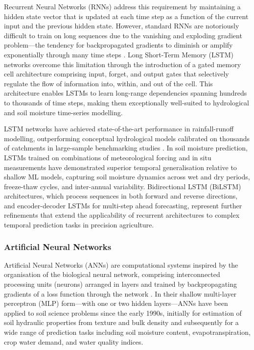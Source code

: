 \documentclass[land,article,submit,pdftex,moreauthors]{Definitions/mdpi}
\numberwithin{equation}{section}
\begin{document}
Recurrent Neural Networks (RNNs) address this requirement by maintaining a hidden state vector that is updated at each time step as a function of the current input and the previous hidden state. However, standard RNNs are notoriously difficult to train on long sequences due to the vanishing and exploding gradient problem---the tendency for backpropagated gradients to diminish or amplify exponentially through many time steps \citep{bengio1994learning}. Long Short-Term Memory (LSTM) networks \citep{hochreiter1997long} overcome this limitation through the introduction of a gated memory cell architecture comprising input, forget, and output gates that selectively regulate the flow of information into, within, and out of the cell. This architecture enables LSTMs to learn long-range dependencies spanning hundreds to thousands of time steps, making them exceptionally well-suited to hydrological and soil moisture time-series modelling.

LSTM networks have achieved state-of-the-art performance in rainfall-runoff modelling, outperforming conceptual hydrological models calibrated on thousands of catchments in large-sample benchmarking studies \citep{kratzert2018rainfall}. In soil moisture prediction, LSTMs trained on combinations of meteorological forcing and in situ measurements have demonstrated superior temporal generalisation relative to shallow ML models, capturing soil moisture dynamics across wet and dry periods, freeze-thaw cycles, and inter-annual variability. Bidirectional LSTM (BiLSTM) architectures, which process sequences in both forward and reverse directions, and encoder-decoder LSTMs for multi-step ahead forecasting, represent further refinements that extend the applicability of recurrent architectures to complex temporal prediction tasks in precision agriculture.

\subsubsection{Artificial Neural Networks}

Artificial Neural Networks (ANNs) are computational systems inspired by the organisation of the biological neural network, comprising interconnected processing units (neurons) arranged in layers and trained by backpropagating gradients of a loss function through the network \citep{goodfellow2016deep}. In their shallow multi-layer perceptron (MLP) form---with one or two hidden layers---ANNs have been applied to soil science problems since the early 1990s, initially for estimation of soil hydraulic properties from texture and bulk density \citep{pachepsky1996developing} and subsequently for a wide range of prediction tasks including soil moisture content, evapotranspiration, crop water demand, and water quality indices.
\end{document}
